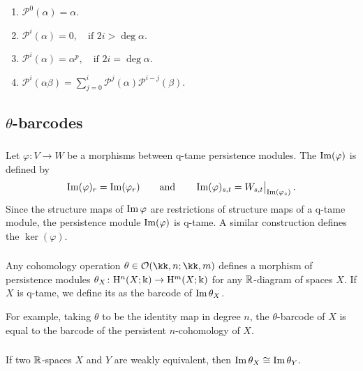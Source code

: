 \begin{enumerate}
	\item \(\mathcal{P}^0(\alpha) = \alpha.\)
	\item \(\mathcal{P}^i(\alpha) = 0, \quad \text{if } 2i > \deg\alpha.\)
	\item \(\mathcal{P}^i(\alpha) = \alpha^p, \quad \text{if } 2i = \deg\alpha.\)
	\item \(\mathcal{P}^i(\alpha \beta) = \textstyle\sum_{j=0}^{i} \mathcal{P}^j(\alpha) \mathcal{P}^{i-j}(\beta).\)
\end{enumerate}

\subsection{$\theta$-barcodes}

\subsubsection{} Let $\varphi \colon V \to W$ be a morphisms between q-tame persistence modules.
The  $\operatorname{Im}(\varphi)$ is defined by
\[
\operatorname{Im}(\varphi)_r = \operatorname{Im}(\varphi_r)
\qquad\text{and}\qquad
\operatorname{Im}(\varphi)_{s,t} = W_{s,t}\big|_{\operatorname{Im}(\varphi_s)}\,.
\]
Since the structure maps of $\operatorname{Im} \varphi$ are restrictions of structure maps of a q-tame module, the persistence module $\operatorname{Im}(\varphi)$ is q-tame.
A similar construction defines the  $\ker(\varphi)$.

\subsubsection{} \label{subsubsec:theta-barcodes}
Any cohomology operation $\theta \in \cO(\kk,n; \kk,m)$ defines a morphism of persistence modules $\theta_X \colon \mathrm{H}^n(X; \Bbbk) \to \mathrm{H}^m(X; \Bbbk)$ for any $\mathbb{R}$-diagram of spaces $X$.
If $X$ is q-tame, we define its  as the barcode of $\operatorname{Im}\theta_X$.

For example, taking $\theta$ to be the identity map in degree $n$, the $\theta$-barcode of $X$ is equal to the barcode of the persistent $n$-cohomology of $X$.

\subsubsection{}\label{lem:w.h.e. preservance}
\lemma If two $\mathbb{R}$-spaces $X$ and $Y$ are weakly equivalent, then $\operatorname{Im}\theta_{X}\cong\operatorname{Im}\theta_{Y}.$

